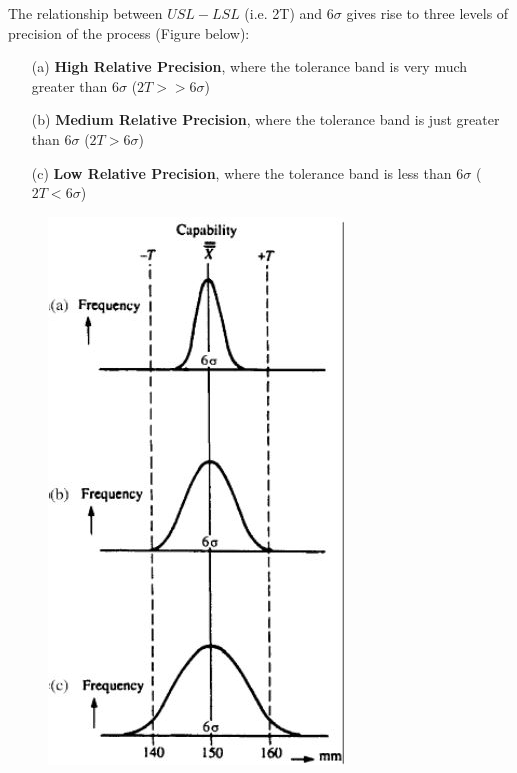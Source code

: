 \documentclass[MASTER-SPC.tex]{subfiles}
\begin{document}
\noindent	The relationship between $USL-LSL$ (i.e. 2T) and $6\sigma$ gives rise
	to three levels of precision of the process (Figure below):
	
	\begin{itemize}
		
		\item[(a)] \textbf{High Relative Precision}, where the tolerance band is very much greater
		than $6\sigma$ ($2T > > 6\sigma$) 
		
		\item[(b)] \textbf{Medium Relative Precision}, where the tolerance band is just greater than
		$6\sigma$ ($2T > 6\sigma$) 
		
		\item[(c)]\textbf{Low Relative Precision}, where the tolerance band is less than
		$6\sigma$ ($2T < 6\sigma$)
	\end{itemize}
\newpage
	\begin{figure}[h!]
		\centering
		\includegraphics[width=0.60\linewidth]{proccapindices/image1b}
	\end{figure}
	
	\newpage
\end{document}
